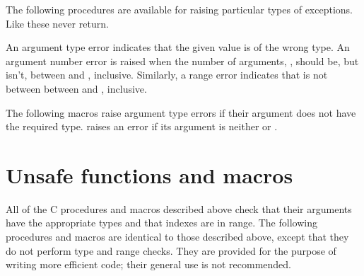 The following procedures are available for raising particular
 types of exceptions.
Like  these never return.

\begin{protos}
\end{protos}

\noindent{}An argument type error indicates that the given value is of the wrong
 type.
An argument number error is raised when the number of arguments, ,
 should be, but isn't, between  and , inclusive.
Similarly, a range error indicates that  is not between
 between  and , inclusive.

The following macros raise argument type errors if their argument does not
 have the required type.
 raises an error if its argument is neither
  or .

\begin{protos}
\end{protos}

\section{Unsafe functions and macros}

All of the C procedures and macros described above check that their
 arguments have the appropriate types and that indexes are in range.
The following procedures and macros are identical to those described
 above, except that they do not perform type and range checks.
They are provided for the purpose of writing more efficient code;
 their general use is not recommended.

